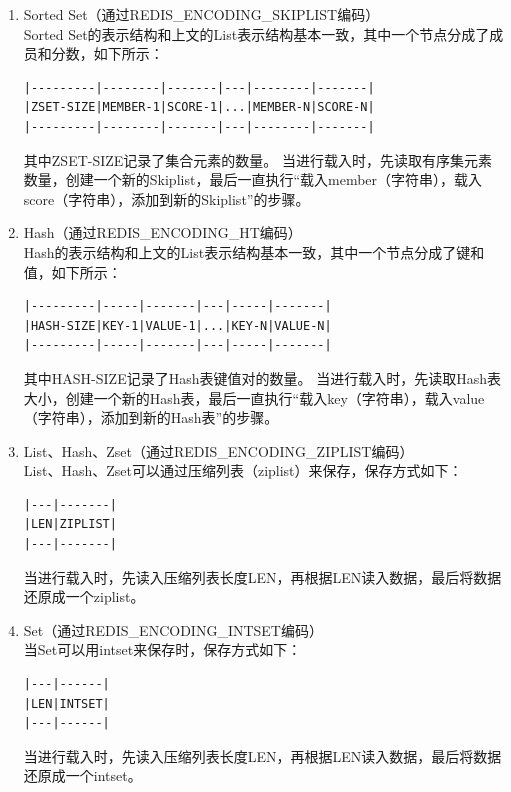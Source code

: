 \documentclass{zjutthesis}
\begin{document}
\begin{enumerate}[label=\arabic*.]
\item{
Sorted Set（通过REDIS\_ENCODING\_SKIPLIST编码）\\
Sorted Set的表示结构和上文的List表示结构基本一致，其中一个节点分成了成员和分数，如下所示：
\begin{verbatim}
|---------|--------|-------|---|--------|-------|
|ZSET-SIZE|MEMBER-1|SCORE-1|...|MEMBER-N|SCORE-N|
|---------|--------|-------|---|--------|-------|
\end{verbatim}
其中ZSET-SIZE记录了集合元素的数量。
当进行载入时，先读取有序集元素数量，创建一个新的Skiplist，最后一直执行“载入member（字符串），载入score（字符串），添加到新的Skiplist”的步骤。
}

\item{
Hash（通过REDIS\_ENCODING\_HT编码）\\
Hash的表示结构和上文的List表示结构基本一致，其中一个节点分成了键和值，如下所示：
\begin{verbatim}
|---------|-----|-------|---|-----|-------|
|HASH-SIZE|KEY-1|VALUE-1|...|KEY-N|VALUE-N|
|---------|-----|-------|---|-----|-------|
\end{verbatim}
其中HASH-SIZE记录了Hash表键值对的数量。
当进行载入时，先读取Hash表大小，创建一个新的Hash表，最后一直执行“载入key（字符串），载入value（字符串），添加到新的Hash表”的步骤。
}

\item{
List、Hash、Zset（通过REDIS\_ENCODING\_ZIPLIST编码）\\
List、Hash、Zset可以通过压缩列表（ziplist）来保存，保存方式如下：
\begin{verbatim}
|---|-------|
|LEN|ZIPLIST|
|---|-------|
\end{verbatim}
当进行载入时，先读入压缩列表长度LEN，再根据LEN读入数据，最后将数据还原成一个ziplist。
}

\item{
Set（通过REDIS\_ENCODING\_INTSET编码）\\
当Set可以用intset来保存时，保存方式如下：
\begin{verbatim}
|---|------|
|LEN|INTSET|
|---|------|
\end{verbatim}
当进行载入时，先读入压缩列表长度LEN，再根据LEN读入数据，最后将数据还原成一个intset。
}
\end{enumerate}
\end{document}

